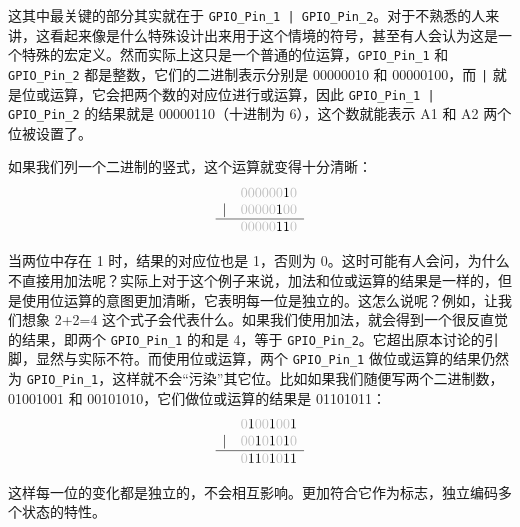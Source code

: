 \begin{itemize}
          这其中最关键的部分其实就在于 \texttt{GPIO\_Pin\_1 | GPIO\_Pin\_2}。对于不熟悉的人来讲，这看起来像是什么特殊设计出来用于这个情境的符号，甚至有人会认为这是一个特殊的宏定义。然而实际上这只是一个普通的位运算，\texttt{GPIO\_Pin\_1} 和 \texttt{GPIO\_Pin\_2} 都是整数，它们的二进制表示分别是 00000010 和 00000100，而 \texttt{|} 就是位或运算，它会把两个数的对应位进行或运算，因此 \texttt{GPIO\_Pin\_1 | GPIO\_Pin\_2} 的结果就是 00000110（十进制为 6），这个数就能表示 A1 和 A2 两个位被设置了。

          如果我们列一个二进制的竖式，这个运算就变得十分清晰：
          \[
              \begin{array}{cc}
                      & \color{lightgray}000000{\color{black}1}0 \\
                  {|} & \color{lightgray}00000{\color{black}1}00 \\
                  \hline
                      & \color{lightgray}00000{\color{black}11}0
              \end{array}
          \]

          当两位中存在 1 时，结果的对应位也是 1，否则为 0。这时可能有人会问，为什么不直接用加法呢？实际上对于这个例子来说，加法和位或运算的结果是一样的，但是使用位运算的意图更加清晰，它表明每一位是独立的。这怎么说呢？例如，让我们想象 2+2=4 这个式子会代表什么。如果我们使用加法，就会得到一个很反直觉的结果，即两个 \texttt{GPIO\_Pin\_1} 的和是 4，等于 \texttt{GPIO\_Pin\_2}。它超出原本讨论的引脚，显然与实际不符。而使用位或运算，两个 \texttt{GPIO\_Pin\_1} 做位或运算的结果仍然为 \texttt{GPIO\_Pin\_1}，这样就不会“污染”其它位。比如如果我们随便写两个二进制数，01001001 和 00101010，它们做位或运算的结果是 01101011：
          \[
              \begin{array}{cc}
                      & \color{lightgray}0{\color{black}1}00{\color{black}1}00{\color{black}1} \\
                  {|} & \color{lightgray}00{\color{black}1}0{\color{black}1}0{\color{black}1}0 \\
                  \hline
                      & \color{lightgray}0{\color{black}11}0{\color{black}1}0{\color{black}11}
              \end{array}
          \]

          这样每一位的变化都是独立的，不会相互影响。更加符合它作为标志，独立编码多个状态的特性。


\end{itemize}
